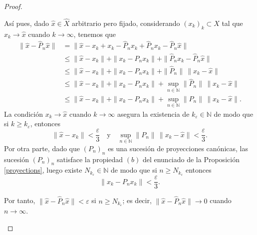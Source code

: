 \begin{proof}
\begin{itemize}
{					Así pues, dado $\hat{x}\in\hat{X}$ arbitrario pero fijado, considerando $(x_k)_k\subset X$ tal que $x_k\to \hat{x}$ cuando $k\to\infty$, tenemos que
					\begin{align*}   
						\|\hat{x}-\hat{P}_n\hat{x}\|&=\|\hat{x}-x_{k}+x_{k}-\hat{P}_nx_{k}+\hat{P}_nx_{k}-\hat{P}_n\hat{x}\|\\ 
						&\leq\|\hat{x}-x_{k}\|+\|x_{k}-P_nx_{k}\|+\|\hat{P}_nx_{k}-\hat{P}_n\hat{x}\|\\ 
						&\leq\|\hat{x}-x_{k}\|+\|x_{k}-P_nx_{k}\|+\|\hat{P}_n\|\,\|x_{k}-\hat{x}\|\\
						&\leq\|\hat{x}-x_{k}\|+\|x_{k}-P_nx_{k}\|+\sup_{n\in\mathbb{N}}\|\hat{P}_n\|\,\|x_{k}-\hat{x}\|\\
						&\leq \|\hat{x}-x_{k}\|+\|x_{k}-P_nx_{k}\|+\sup_{n\in\mathbb{N}}\|P_n\|\,\|x_{k}-\hat{x}\|.
					\end{align*}
					La condición $x_k\to \hat{x}$ cuando $k\to\infty$ asegura la existencia de $k_\varepsilon\in\mathbb{N}$ de modo que si $k\geq k_\varepsilon$, entonces
					\[\|\hat{x}-x_{k}\|<\dfrac{\varepsilon}{3}\quad\text{y}\quad \sup_{n\in\mathbb{N}}\|P_n\|\,\|x_{k}-\hat{x}\|<\dfrac{\varepsilon}{3}.\]
					Por otra parte, dado que $(P_n)_n$ es una sucesión de proyecciones canónicas, las sucesión $(P_n)_n$ satisface la propiedad $(b)$ del enunciado de la Proposición \ref{proyections}, luego existe $N_{k_\varepsilon}\in\mathbb{N}$ de modo que si $n\geq N_{k_\varepsilon}$ entonces
					\[\|x_{k}-P_nx_{k}\|<\dfrac{\varepsilon}{3}.\]
					
					Por tanto, $\|\hat{x}-\hat{P}_n\hat{x}\|<\varepsilon$ si $n\geq N_{k_\varepsilon}$; es decir, $\|\hat{x}-\hat{P}_n\hat{x}\|\to 0$ cuando $n\to\infty$.\qedhere}
			\end{itemize}
		\end{proof}
	
